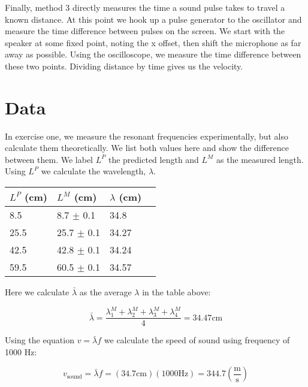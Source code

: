 \documentclass[12pt]{article}
\begin{document}
Finally, method 3 directly measures the time a sound pulse takes to
travel a known distance. At this point we hook up a pulse generator to
the oscillator and measure the time difference between pulses on the
screen. We start with the speaker at some fixed point, noting the x
offset, then shift the microphone as far away as possible. Using the
oscilloscope, we measure the time difference between these two
points. Dividing distance by time gives us the velocity.

\section*{Data}

In exercise one, we measure the resonant frequencies experimentally,
but also calculate them theoretically. We list both values here and
show the difference between them. We label $L^P$ the
predicted length and $L^M$ as the measured length. Using
$L^P$ we calculate the wavelength, $\lambda$.

\begin{center}
  \begin{tabular}{|l|l|l|l|}
    \hline
    $L^P$ (cm) & $L^M$ (cm) & $\lambda$ (cm) \\
    \hline
    8.5 & 8.7 $\pm$ 0.1 & 34.8 \\
    25.5 & 25.7 $\pm$ 0.1 & 34.27 \\
    42.5 & 42.8 $\pm$ 0.1 & 34.24 \\
    59.5 & 60.5 $\pm$ 0.1 & 34.57 \\
    \hline
  \end{tabular}
\end{center}

Here we calculate $\bar{\lambda}$ as the average $\lambda$ in the
table above:

\begin{center}
  \begin{equation*}
    \bar{\lambda} = \dfrac{\lambda_1^M + \lambda_2^M + \lambda_3^M + \lambda_4^M}{4} = 34.47 \mathrm{cm}
  \end{equation*}
\end{center}

Using the equation $v = \bar{\lambda}f$ we calculate the speed of
sound using frequency of 1000 Hz:

\begin{center}
  \begin{equation*}
    v_{\mathrm{sound}} = \bar{\lambda} f 
    = (34.7\mathrm{cm})(1000 \mathrm{Hz}) 
    = 344.7 \left(\frac{\mathrm{m}}{\mathrm{s}}\right)
  \end{equation*}
\end{center}
\end{document}
